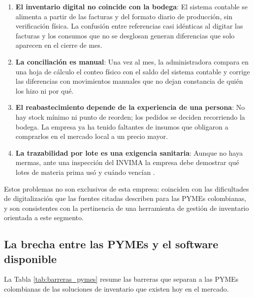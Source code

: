 \begin{enumerate}
    \item \textbf{El inventario digital no coincide con la bodega}: El sistema contable se alimenta a partir de las facturas y del formato diario de producción, sin verificación física. La confusión entre referencias casi idénticas al digitar las facturas y los consumos que no se desglosan generan diferencias que solo aparecen en el cierre de mes.
    \item \textbf{La conciliación es manual}: Una vez al mes, la administradora compara en una hoja de cálculo el conteo físico con el saldo del sistema contable y corrige las diferencias con movimientos manuales que no dejan constancia de quién los hizo ni por qué.
    \item \textbf{El reabastecimiento depende de la experiencia de una persona}: No hay stock mínimo ni punto de reorden; los pedidos se deciden recorriendo la bodega. La empresa ya ha tenido faltantes de insumos que obligaron a comprarlos en el mercado local a un precio mayor.
    \item \textbf{La trazabilidad por lote es una exigencia sanitaria}: Aunque no haya mermas, ante una inspección del INVIMA la empresa debe demostrar qué lotes de materia prima usó y cuándo vencían \cite{res2674_2013}.
\end{enumerate}

Estos problemas no son exclusivos de esta empresa: coinciden con las dificultades de digitalización que las fuentes citadas describen para las PYMEs colombianas, y son consistentes con la pertinencia de una herramienta de gestión de inventario orientada a este segmento.

\subsection{La brecha entre las PYMEs y el software disponible}

La Tabla \ref{tab:barreras_pymes} resume las barreras que separan a las PYMEs colombianas de las soluciones de inventario que existen hoy en el mercado.

